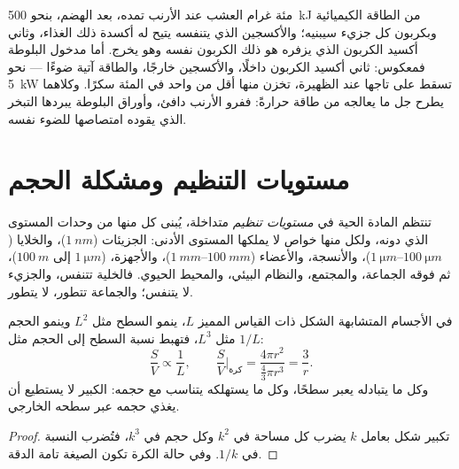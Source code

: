 \begin{example}\label{ex:b1:organism-environment:rabbitoak}
مئة غرام العشب عند الأرنب تمده، بعد الهضم، بنحو \qty{500}{kJ} من
الطاقة الكيميائية وبكربون كل جزيء سيبنيه؛ والأكسجين الذي يتنفسه
يتيح له أكسدة ذلك الغذاء، وثاني أكسيد الكربون الذي يزفره هو ذلك
الكربون نفسه وهو يخرج. أما مدخول البلوطة فمعكوس: ثاني أكسيد الكربون
داخلًا، والأكسجين خارجًا، والطاقة آتية ضوءًا --- نحو \qty{5}{kW}
تسقط على تاجها عند الظهيرة، تخزن منها أقل من واحد في المئة سكرًا.
وكلاهما يطرح جل ما يعالجه من طاقة حرارةً: ففرو الأرنب دافئ، وأوراق
البلوطة يبردها التبخر الذي يقوده امتصاصها للضوء نفسه.
\end{example}

\section{مستويات التنظيم ومشكلة الحجم}

\begin{definition}\label{def:b1:organism-environment:levels}
تنتظم المادة الحية في \emph{مستويات تنظيم}
متداخلة، يُبنى كل منها من وحدات المستوى الذي دونه، ولكل منها خواص لا
يملكها المستوى الأدنى: الجزيئات ($\qty{1}{nm}$)، والخلايا
($\qtyrange{1}{100}{\micro m}$)، والأنسجة، والأعضاء
($\qtyrange{1}{100}{mm}$)، والأجهزة، 
($\qty{1}{\micro m}$ إلى $\qty{100}{m}$)، ثم فوقه الجماعة، والمجتمع،
والنظام البيئي، والمحيط الحيوي. فالخلية تتنفس، والجزيء لا يتنفس؛
والجماعة تتطور،  لا يتطور.
\end{definition}

\begin{proposition}\label{prop:b1:organism-environment:sv}
في الأجسام المتشابهة الشكل ذات القياس المميز $L$، ينمو السطح مثل
$L^2$ وينمو الحجم مثل $L^3$، فتهبط نسبة السطح إلى الحجم مثل $1/L$:
\[
\frac{S}{V} \propto \frac{1}{L}, \qquad
\frac{S}{V}\Big|_{\text{كرة}} = \frac{4\pi r^2}{\tfrac{4}{3}\pi r^3} = \frac{3}{r}.
\]
وكل ما يتبادله  يعبر سطحًا، وكل ما يستهلكه يتناسب مع
حجمه:  الكبير لا يستطيع أن يغذي حجمه عبر سطحه الخارجي.
\end{proposition}
\begin{proof}
تكبير شكل بعامل $k$ يضرب كل مساحة في $k^2$ وكل حجم في $k^3$، فتُضرب
النسبة في $1/k$. وفي حالة الكرة تكون الصيغة تامة الدقة.
\end{proof}

